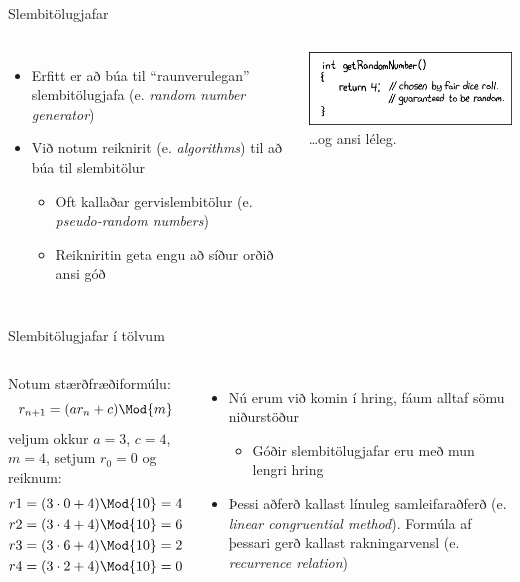 \documentclass[handout]{beamer}
\begin{document}
\begin{frame}{Slembitölugjafar}
\begin{columns}
\begin{itemize}
 \item Erfitt er að búa til ``raunverulegan'' slembitölugjafa (e. \emph{random number generator})
 \item Við notum reiknirit (e. \emph{algorithms}) til að búa til slembitölur
 \begin{itemize}
  \item Oft kallaðar gervislembitölur (e. \emph{pseudo-random numbers})
  \item Reikniritin geta engu að síður orðið ansi góð \pause
 \end{itemize}
\end{itemize}
\begin{center}
\includegraphics[width=\linewidth]{Pics/xkcd-random} \\
\ldots og ansi léleg.
\end{center}
\end{columns}
\end{frame}

\begin{frame}{Slembitölugjafar í tölvum}
\begin{columns}
Notum stærðfræðiformúlu:
\[
r_{n+1} = (ar_n + c) \Mod{m}
\]
veljum okkur $a=3$, $c=4$, $m=4$, setjum $r_0 = 0$ og reiknum:
\begin{align*}
r1 = (3 \cdot 0 + 4) \Mod{10}  &=  4\\
r2 = (3 \cdot 4 + 4) \Mod{10}  &=  6\\
r3 = (3 \cdot 6 + 4) \Mod{10}  &=  2\\
r4 = (3 \cdot 2 + 4) \Mod{10}  &=  0\\
\end{align*}
\begin{itemize}
\item Nú erum við komin í hring, fáum alltaf sömu niðurstöður
 \begin{itemize}
  \item Góðir slembitölugjafar eru með mun lengri hring
 \end{itemize}
 \item Þessi aðferð kallast línuleg samleifaraðferð (e. \emph{linear congruential method}). Formúla af þessari gerð kallast rakningarvensl (e. \emph{recurrence relation})
\end{itemize}
\end{columns}
\end{frame}
\end{document}
